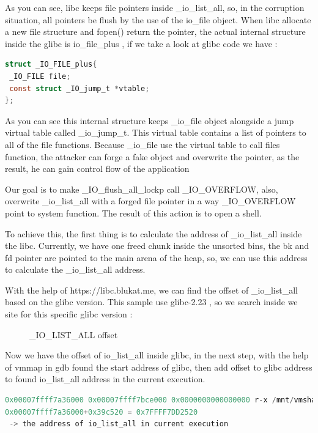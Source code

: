 \documentclass{masterthesis}
\newcommand*\libc{glibc}
\newcommand*\ub{unsorted bins}
\begin{document}
As you can see, libc keeps file pointers inside \_io\_list\_all, so, in the corruption situation, all pointers be flush by the use of the io\_file object. When libc allocate a new file structure and fopen() return the pointer, the actual internal structure inside the \libc{} is io\_file\_plus , if we take a look at \libc{} code we have :

\begin{lstlisting}[language=c,frame=tlrb]
struct _IO_FILE_plus{
 _IO_FILE file;
 const struct _IO_jump_t *vtable;
};
\end{lstlisting}

As you can see this internal structure keeps \_io\_file object alongside a jump virtual table called \_io\_jump\_t. This virtual table contains a list of pointers to all of the file functions. Because \_io\_file use the virtual table to call files function, the attacker can forge a fake object and overwrite the pointer, as the result, he can gain control flow of the application

Our goal is to make \_IO\_flush\_all\_lockp call \_IO\_OVERFLOW, also, overwrite \_io\_list\_all with a forged file pointer in a way \_IO\_OVERFLOW point to system function. The result of this action is to open a shell.

To achieve this, the first thing is to calculate the address of \_io\_list\_all inside the libc. Currently, we have one freed chunk inside the \ub{}, the bk and fd pointer are pointed to the main arena of the heap, so, we can use this address to calculate the \_io\_list\_all address. 

With the help of https://libc.blukat.me, we can find the offset of \_io\_list\_all based on the \libc{} version. This sample use \libc{-2.23} , so we search inside we site for this specific \libc{} version :

\begin{figure}[h!]
  \caption{\_IO\_LIST\_ALL offset}
\end{figure}


Now we have the offset of io\_list\_all inside \libc{}, in the next step, with the help of vmmap in gdb found the start address of \libc{}, then add offset to \libc{} address to found io\_list\_all address in the current execution.
\begin{lstlisting}[language=c,frame=tlrb]
0x00007ffff7a36000 0x00007ffff7bce000 0x0000000000000000 r-x /mnt/vmshare/MasterThesis/libc223/libc.so.6
0x00007ffff7a36000+0x39c520 = 0x7FFFF7DD2520
 -> the address of io_list_all in current execution
\end{lstlisting}
\end{document}
